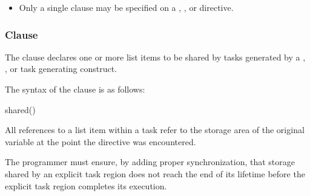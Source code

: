 \begin{itemize}
\item Only a single  clause may be specified on a
, ,  or  directive.
\end{itemize}









\subsubsection{ Clause}
\label{subsubsec:shared clause}
\summary
The  clause declares one or more list items to be shared by tasks generated by
a , , or task generating construct.

\syntax
The syntax of the  clause is as follows:

\begin{ompSyntax}
shared()
\end{ompSyntax}

\descr
All references to a list item within a task refer to the storage area of the original variable
at the point the directive was encountered.

The programmer must ensure, by adding proper synchronization, that
storage shared by an explicit task region does not reach the end of its lifetime before
the explicit task region completes its execution.


